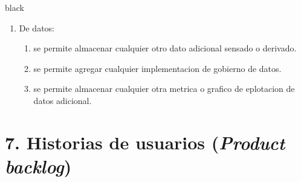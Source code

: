 \documentclass[
11pt, %
]{charter}
\begin{document}
\begin{consigna}{black}
\begin{enumerate}
\begin{enumerate}
			\item De datos: 
				\begin{enumerate}			
					\item se permite almacenar cualquier otro dato adicional sensado o derivado.
					\item se permite agregar cualquier implementacion de gobierno de datos.	
					\item se permite almacenar cualquier otra metrica o grafico de eplotacion de datos adicional.
				\end{enumerate}
		
	\end{enumerate}
\end{enumerate}
\end{consigna}

\section{7. Historias de usuarios (\textit{Product backlog})}
\label{sec:backlog}
\end{document}
